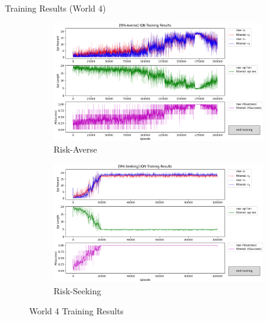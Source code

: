 \documentclass[aspectratio=1610, xcolor=dvipsnames]{packages/beamer}
\begin{document}
\begin{frame}{Training Results (World 4)}
     \begin{figure}
     \centering
         \begin{subfigure}[b]{\Wfig\textwidth} \centering
             \includegraphics[width=\textwidth]{../results/IDQN_W4/Fig_W4_JointQ_Averse}
             \caption{Risk-Averse} \label{fig:W4averse}
         \end{subfigure}
         \hfill
         \begin{subfigure}[b]{\Wfig\textwidth} \centering
             \includegraphics[width=\textwidth]{../results/IDQN_W4/Fig_W4_JointQ_Seeking}
             \caption{Risk-Seeking} \label{fig:W4seeking}
         \end{subfigure}
    \caption{World 4 Training Results}
    \label{fig:W4}
    \end{figure}
\end{frame}
\end{document}
